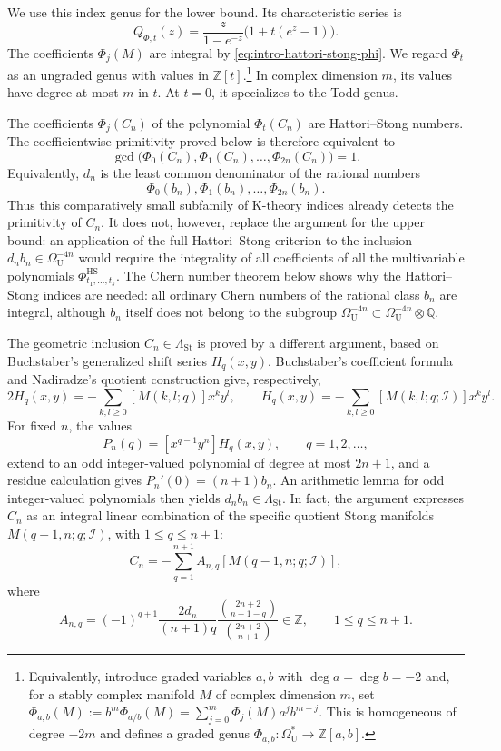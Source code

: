 \documentclass[14pt,dvipsnames]{extarticle}
\numberwithin{equation}{subsection}
\theoremstyle{plain}
\theoremstyle{definition}
\theoremstyle{definition}
\newcommand{\OmU}{\Omega_{\mathrm U}^{\ast}}
\newcommand{\Ii}{\mathcal I}
\newcommand{\Uu}{\mathrm{U}}
\newcommand{\LambdaSt}{\Lambda_{\mathrm{St}}}
\newcommand{\Q}{\mathbb{Q}}
\begin{document}
We use this index genus for the lower bound. Its
characteristic series is
\[
 Q_{\Phi,t}(z)
 =\frac{z}{1-e^{-z}}\bigl(1+t(e^z-1)\bigr).
\]
The coefficients $\Phi_j(M)$ are integral by
\eqref{eq:intro-hattori-stong-phi}. We regard $\Phi_t$ as an ungraded genus
with values in $\mathbb Z[t]$.\footnote{Equivalently, introduce graded
variables $a,b$ with $\deg a=\deg b=-2$ and, for a stably complex manifold
$M$ of complex dimension $m$, set
$\Phi_{a,b}(M):=b^m\Phi_{a/b}(M)=\sum_{j=0}^m\Phi_j(M)a^jb^{m-j}$.
This is homogeneous of degree $-2m$ and defines a graded genus
$\Phi_{a,b}\colon\OmU\to\mathbb Z[a,b]$.} In complex dimension $m$, its
values have
degree at most $m$ in $t$. At $t=0$, it specializes to the Todd genus.

The coefficients $\Phi_j(C_n)$ of the polynomial $\Phi_t(C_n)$ are
Hattori--Stong numbers. The coefficientwise primitivity proved
below is therefore equivalent to
\[
 \gcd\bigl(\Phi_0(C_n),\Phi_1(C_n),\ldots,\Phi_{2n}(C_n)\bigr)=1.
\]
Equivalently, $d_n$ is the least common denominator of the rational numbers
\[
 \Phi_0(b_n),\Phi_1(b_n),\ldots,\Phi_{2n}(b_n).
\]
Thus this comparatively small subfamily of $\mathrm{K}$-theory indices already detects
the primitivity of $C_n$. It does not, however, replace the argument for the
upper bound: an application of the full Hattori--Stong criterion to the inclusion
$d_nb_n\in\Omega_{\Uu}^{-4n}$ would require the integrality of all coefficients
of all the multivariable polynomials
$\Phi^{\mathrm{HS}}_{t_1,\ldots,t_s}$. The Chern number theorem below shows why
the Hattori--Stong indices are needed: all ordinary Chern numbers of the rational
class $b_n$ are integral, although $b_n$ itself does not belong to the subgroup
$\Omega_{\Uu}^{-4n}\subset\Omega_{\Uu}^{-4n}\otimes\Q$.

The geometric inclusion $C_n\in\LambdaSt$ is proved by a different argument,
based on Buchstaber's generalized shift series $H_q(x,y)$. Buchstaber's
coefficient formula and Nadiradze's quotient construction give, respectively,
\[
 2H_q(x,y)
 =-\sum_{k,l\geq0}[M(k,l;q)]x^ky^l,
 \qquad
 H_q(x,y)
 =-\sum_{k,l\geq0}[M(k,l;q;\Ii)]x^ky^l.
\]
For fixed $n$, the values
\[
 P_n(q)=[x^{q-1}y^n]H_q(x,y),
 \qquad q=1,2,\ldots,
\]
extend to an odd integer-valued polynomial of degree at most $2n+1$, and a
residue calculation gives $P_n'(0)=(n+1)b_n$. An arithmetic lemma for odd
integer-valued polynomials then yields $d_nb_n\in\LambdaSt$. In fact, the
argument expresses $C_n$ as an integral linear combination of the specific
quotient Stong manifolds $M(q-1,n;q;\Ii)$, with $1\leq q\leq n+1$:
\begin{equation}\label{eq:Cn-stong-combination-intro}
 C_n=-\sum_{q=1}^{n+1}A_{n,q}[M(q-1,n;q;\Ii)],
\end{equation}
where
\[
 A_{n,q}
 =(-1)^{q+1}\frac{2d_n}{(n+1)q}
   \frac{\binom{2n+2}{n+1-q}}{\binom{2n+2}{n+1}}
 \in\mathbb Z,
 \qquad 1\leq q\leq n+1.
\]
\end{document}
